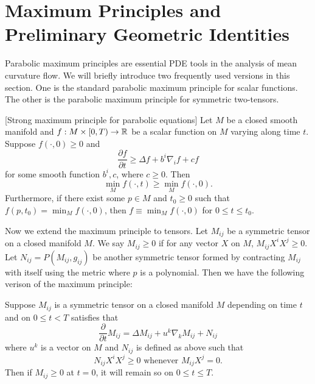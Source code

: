 \section{Maximum Principles and Preliminary Geometric Identities}

Parabolic maximum principles are essential PDE tools in the analysis of mean curvature flow. We will briefly introduce two frequently used versions in this section. One is the standard parabolic maximum principle for scalar functions. The other is the parabolic maximum principle for symmetric two-tensors.

\begin{theorem} \label{thm:MPP}[Strong maximum principle for parabolic equations]
	Let $M$ be a closed smooth manifold and $f: M \times [0,T) \to \mathbb{R}$ be a scalar function on $M$ varying along time $t$. Suppose $f (\cdot,0) \geq 0$ and
	\[
		\frac{\partial f}{\partial t} \geq \Delta f + b^{i} \nabla_{i}^{} f+ cf
	\]
	for some smooth function $b^i,c$, where $c \geq 0.$ Then
	\[\min _M f (\cdot,t) \geq \min _M f (\cdot,0).\]
	Furthermore, if there exist some $p \in M$ and $t_0 \geq 0$ such that $f(p,t_0)=\min _M f (\cdot,0) $, then $f \equiv \min _M f (\cdot,0)$ for $0 \leq t \leq t_0.$
\end{theorem}

Now we extend the maximum principle to tensors. Let $M_{ij}$ be a symmetric tensor on a closed manifold $M$. We say $M_{ij }^{} \geq 0 $ if for any vector $X$ on $M$, $M_{ij }^{} X^i X^j \geq 0$. Let $N_{ij }^{} = P(M_{ij }^{} , g_{ij}^{} )$ be another symmetric tensor formed by contracting $M_{ij }^{} $ with itself using the metric where $p$ is a polynomial. Then we have the following verison of the maximum principle:

\begin{theorem} \label{thm:MP2T}
	Suppose $M_{ij }^{} $ is a symmetric tensor on a closed manifold $M$ depending on time $t$ and on $0 \leq t < T$ satisfies that \[\frac{\partial }{\partial t} M_{ij }^{} = \Delta M_{ij }^{} + u^k \nabla_{k}^{} M_{ij }^{} + N_{ij }^{} \] where $u^k$ is a vector on $M$ and $N_{ij }^{} $ is defined as above such that 
	\[
		N_{ij }^{} X^i X^j \geq 0 \text{   whenever  } M_{ij }^{} X^j =0.
	\]
	Then if $M_{ij }^{} \geq 0$ at $t=0$, it will remain so on $0 \leq t \leq T$.
\end{theorem}

